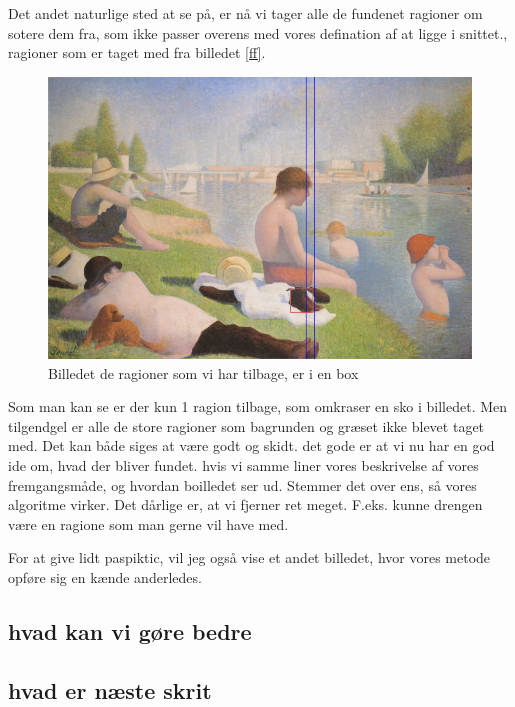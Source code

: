 Det andet naturlige sted at se på, er nå vi tager alle de fundenet ragioner om sotere dem fra, som ikke passer overens med vores defination af at ligge i snittet., ragioner som er taget med fra billedet \ref{ff}. 

\begin{figure}[h]
	\begin{center}
		\includegraphics[scale=0.42,angle=0]{afsnit/afprovning/billeder/boindingboxbilledet.png}
	\end{center}
	\caption[]{Billedet de ragioner som vi har tilbage, er i en box}
	\label{blob}
\end{figure}

Som man kan se er der kun 1 ragion tilbage, som omkraser en sko i
billedet. Men tilgendgel er alle de store ragioner som bagrunden og
græset ikke blevet taget med. Det kan både siges at være godt og skidt.
det gode er at vi nu har en god ide om, hvad der bliver fundet. hvis vi
samme liner vores beskrivelse af vores fremgangsmåde, og hvordan
boilledet ser ud. Stemmer det over ens, så vores algoritme virker. Det
dårlige er, at vi fjerner ret meget. F.eks. kunne drengen være en
ragione som man gerne vil have med.

For at give lidt paspiktic, vil jeg også vise et andet billedet, hvor vores metode opføre sig en kænde anderledes.
	
 
\subsection{hvad kan vi gøre bedre}


\subsection{hvad er næste skrit}

